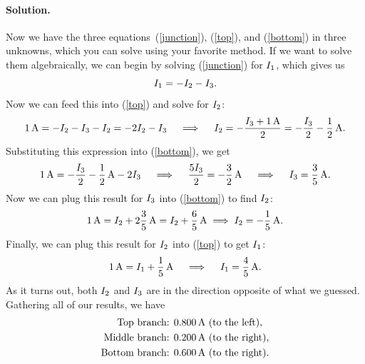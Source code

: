 \documentclass[11pt]{article}
\newcommand{\refeq}[1]{(\ref{#1})}
\newcommand{\beq}{\begin{equation*}}
\newcommand{\eeq}{\end{equation*}}
\newenvironment{solution}
{
    \paragraph{Solution.}
    \ignorespaces
}
{
    \bigskip
}
\begin{document}
\begin{solution}
\begin{enumerate}
		Now we have the three equations~\refeq{junction}, \refeq{top}, and \refeq{bottom} in three unknowns, which you can solve using your favorite method.  If we want to solve them algebraically, we can begin by solving \refeq{junction} for $I_1$, which gives us
		\beq
			\Iq = - \Iw - \Ie.
		\eeq
		Now we can feed this into \refeq{top} and solve for $I_2$:
		\beq
			\Samp{1} = -\Iw - \Ie - \Iw = -2 \Iw - \Ie
			\qimplies
			\Iw = -\frac{\Ie + \Samp{1}}{2}
			= -\frac{\Ie}{2} - \frac{1}{2}\,\si{\ampere}.
		\eeq
		Substituting this expression into \refeq{bottom}, we get
		\beq
			\Samp{1} = -\frac{\Ie}{2} - \frac{1}{2}\,\si{\ampere} - 2 \Ie
			\qimplies
			\frac{5 \Ie}{2} = -\frac{3}{2}\,\si{\ampere}
			\qimplies
			\Ie = \frac{3}{5}\,\si{\ampere}.
		\eeq
		Now we can plug this result for $I_3$ into \refeq{bottom} to find $I_2$:
		\beq
			\Samp{1} = \Iw + 2 \frac{3}{5}\,\si{\ampere} = \Iw + \frac{6}{5}\,\si{\ampere}
			\implies
			\Iw = -\frac{1}{5}\,\si{\ampere}.
		\eeq
		Finally, we can plug this result for $I_2$ into \refeq{top} to get $I_1$:
		\beq
			\Samp{1} = \Iq + \frac{1}{5}\,\si{\ampere}
			\qimplies
			\Iq = \frac{4}{5}\,\si{\ampere}.
		\eeq
		As it turns out, both $I_2$ and $I_3$ are in the direction opposite of what we guessed.  Gathering all of our results, we have
		{\color{blue} \begin{align*}
			\text{Top branch: }& \SI{0.800}{\ampere} \text{ (to the left)}, \\
			\text{Middle branch: }& \SI{0.200}{\ampere} \text{ (to the right)}, \\
			\text{Bottom branch: }& \SI{0.600}{\ampere} \text{ (to the right)}.
		\end{align*}}


\end{enumerate}
\end{solution}
\end{document}
